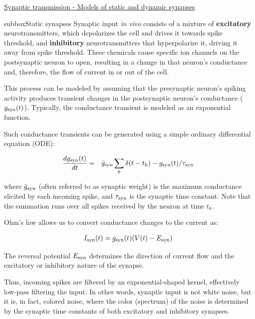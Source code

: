 \begin{textbox}{\href{https://compneuro.neuromatch.io/tutorials/W2D3_BiologicalNeuronModels/student/W2D3_Tutorial3.html}{Synaptic transmission - Models of static and dynamic synapses } }


\begin{subbox}{subbox}{Static synapses}
\scriptsize
Synaptic input \textit{in vivo} consists of a mixture of \textbf{excitatory} neurotransmitters, which depolarizes the cell and drives it towards spike threshold, and \textbf{inhibitory} neurotransmitters that hyperpolarize it, driving it away from spike threshold. These chemicals cause specific ion channels on the postsynaptic neuron to open, resulting in a change in that neuron's conductance and, therefore, the flow of current in or out of the cell.

This process can be modeled by assuming that the presynaptic neuron's spiking activity produces transient changes in the postsynaptic neuron's conductance ($g_{\rm syn}(t)$). Typically, the conductance transient is modeled as an exponential function. 

Such conductance transients can be generated using a simple ordinary differential equation (ODE):

\begin{eqnarray}
\frac{dg_{\rm syn}(t)}{dt} &=& \bar{g}_{\rm syn} \sum_k \delta(t-t_k) -g_{\rm syn}(t)/\tau_{\rm syn}
\end{eqnarray}

where $\bar{g}_{\rm syn}$ (often referred to as synaptic weight) is the maximum conductance elicited by each incoming spike, and $\tau_{\rm syn}$ is the synaptic time constant. Note that the summation runs over all spikes received by the neuron at time $t_k$.

Ohm's law allows us to convert conductance changes to the current as:

\begin{align}
I_{\rm syn}(t) = g_{\rm syn}(t)(V(t)-E_{\rm syn}) 
\end{align}

The reversal potential $E_{\rm syn}$ determines the direction of current flow and the excitatory or inhibitory nature of the synapse. 

Thus, incoming spikes are filtered by an exponential-shaped kernel, effectively low-pass filtering the input. In other words, synaptic input is not white noise, but it is, in fact, colored noise, where the color (spectrum) of the noise is determined by the synaptic time constants of both excitatory and inhibitory synapses.


\end{subbox}
\end{textbox}
